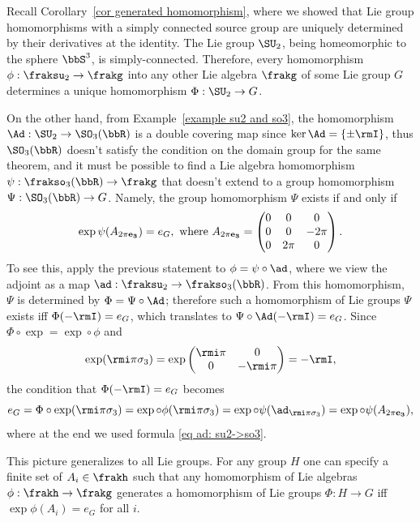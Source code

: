 \begin{example}
    Recall Corollary~\ref{cor generated homomorphism}, where we showed that Lie group homomorphisms with a simply connected source group are uniquely determined by their derivatives at the identity. The Lie group $\SU_2$, being homeomorphic to the sphere $\bbS^3$, is simply-connected. Therefore, every homomorphism $\phi:\fraksu_2\to\frakg$ into any other Lie algebra $\frakg$ of some Lie group $G$ determines a unique homomorphism $\Phi:\SU_2\to G$. 
    
    On the other hand, from Example~\ref{example su2 and so3}, the homomorphism $\Ad:\SU_2\to \SO_3(\bbR)$ is a double covering map since $\ker\Ad=\{\pm \rmI\}$, thus $\SO_3(\bbR)$ doesn't satisfy the condition on the domain group for the same theorem, and it must be possible to find a Lie algebra homomorphism $\psi:\frakso_3(\bbR)\to\frakg$ that doesn't extend to a group homomorphism $\Psi:\SO_3(\bbR)\to G$. Namely, the group homomorphism $\Psi$ exists if and only if 
    \[\exp \psi(A_{2\pi \bf{e}_3})=e_G,\text{ where }A_{2\pi \bf{e}_3}=
    \begin{pmatrix}
        0&0&0\\
        0&0&-2\pi\\
        0&2\pi &0
    \end{pmatrix}.
    \]
    To see this, apply the previous statement to $\phi=\psi\circ\ad$, where we view the adjoint as a map $\ad:\fraksu_2\to\frakso_3(\bbR)$. From this homomorphism, $\Psi$ is determined by $\Phi=\Psi\circ \Ad$; therefore such a homomorphism of Lie groups $\Psi$ exists iff $\Phi(-\rmI)=e_G$, which translates to $\Psi\circ \Ad(-\rmI)=e_G$. Since $\Phi\circ\exp=\exp\circ\phi$ and 
    \[\exp(\rmi \pi\sigma_3)=\exp \begin{pmatrix}
        \rmi \pi&0\\0 &-\rmi \pi
    \end{pmatrix}=-\rmI,\]
    the condition that $\Phi(-\rmI)=e_G$ becomes
    \[e_G=\Phi\circ \exp (\rmi\pi\sigma_3)=\exp\circ\phi (\rmi\pi\sigma_3)=\exp\circ\psi( \ad_{\rmi\pi\sigma_3})=\exp\circ\psi (A_{2\pi \bf{e}_3}),\]
    where at the end we used formula \eqref{eq ad: su2->so3}.
    
    This picture generalizes to all Lie groups. For any group $H$ one can specify a finite set of $A_i\in\frakh$ such that any homomorphism of Lie algebras $\phi:\frakh\to\frakg$ generates a homomorphism of Lie groups $\Phi:H\to G$ iff $\exp\phi(A_i)=e_G$ for all $i$.
\end{example}


